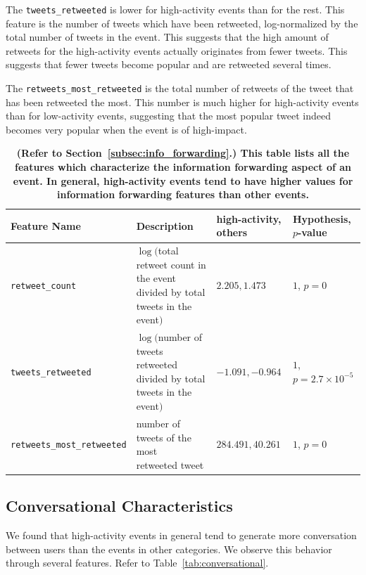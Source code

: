 The \texttt{tweets\_retweeted} is lower for high-activity events than
for the rest. This feature is the number of tweets which have been
retweeted, log-normalized by the total number of tweets in the event.
This suggests that the high amount of retweets for the high-activity
events actually originates from fewer tweets.  This suggests that
fewer tweets become popular and are retweeted several times.

The \texttt{retweets\_most\_retweeted} is the total number of retweets
of the tweet that has been retweeted the most.  This number is much higher for high-activity
events than for low-activity events, suggesting that the most popular
tweet indeed becomes very popular when the event is of high-impact.

\begin{table}
  \centering
  {\scriptsize
    \begin{tabular}{llll}
      \toprule
      Feature Name &  \multicolumn{1}{l}{Description} & high-activity, others& Hypothesis, $p$-value\\
      \midrule
      \texttt{retweet\_count} & \pbox{20cm}{$\log($total retweet count \\in the event divided by total\\ tweets in the event$)$} & $2.205, 1.473$ & $1$, $p = 0$ \\
      \midrule
      \texttt{tweets\_retweeted} & \pbox{20cm}{$\log($number of tweets \\retweeted divided by\\ total tweets in the event$)$} & $-1.091, -0.964$ & $1$, $p = 2.7\times10^{-5}$ \\
      \midrule
      \texttt{retweets\_most\_retweeted} & \pbox{20cm}{number of tweets of the most \\retweeted tweet} & $284.491, 40.261$ & $1$, $p = 0$ \\
      \bottomrule
    \end{tabular}
  }
  \caption{\textbf{(Refer to Section~\ref{subsec:info_forwarding}.) This table lists all the features which characterize the information forwarding aspect of an event.  In general, high-activity events tend to have higher values for information forwarding features than other events.}}
  \label{tab:information_forwarding}
\end{table}


\subsection{Conversational Characteristics}
\label{subsec:conversational}
We found that high-activity events in general tend to generate more
conversation between users than the events in other categories. We observe this
behavior through several features. Refer to
Table~\ref{tab:conversational}.

